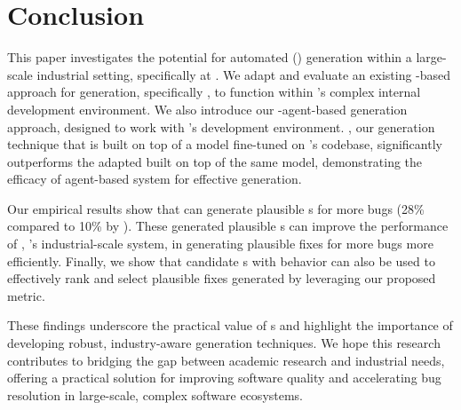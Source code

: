 \section{Conclusion}
\label{sec:conclusion}

This paper investigates the potential for automated \brtfull (\brt) generation within a large-scale industrial setting, specifically at \google. 
We adapt and evaluate an existing \llm-based approach for \brt generation, specifically \libro \cite{kang2023large}, to function within \google's complex internal development environment.
We also introduce our \llm-agent-based \brt generation approach, designed to work with \google's development environment. 
\tool, our \brt generation technique that is built on top of a \gemini model fine-tuned on \google's codebase, significantly outperforms the adapted \libro built on top of the same \gemini model, demonstrating the efficacy of agent-based system for effective \brt generation.


Our empirical results show that \tool can generate plausible \brt{}s for more bugs (28\% compared to 10\% by \libro). 
These generated plausible \brt{}s can improve the performance of \passerine, \google's industrial-scale \autopr system, in generating plausible fixes for more bugs more efficiently. 
Finally, we show that candidate \brt{}s with \failtoany behavior can also be used to effectively rank and select plausible fixes generated by \autopr leveraging our proposed \enpassratefull metric.

These findings underscore the practical value of \brt{}s and highlight the importance of developing robust, industry-aware \brt generation techniques. 
We hope this research contributes to bridging the gap between academic research and industrial needs, offering a practical solution for improving software quality and accelerating bug resolution in large-scale, complex software ecosystems.
